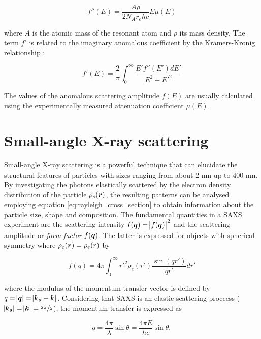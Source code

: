 \begin{equation}
        f'' (E) = \frac{A\rho}{2N_A r_e h c} E \mu(E)
\end{equation}

where $A$ is the atomic mass of the resonant atom and $\rho$ its mass density. The term $f'$ is related to the imaginary anomalous coefficient by the Kramers-Kronig relationship \citep{de_l._kronig_theory_1926,kramers_diffusion_1927}:

\begin{equation}
        f'(E) = \frac{2}{\pi} \int_0^{\infty} \frac{E'f''(E')dE'}{E^2 - E'^2}
\end{equation}

The values of the anomalous scattering amplitude $f(E)$ are usually calculated using the experimentally measured attenuation coefficient $\mu(E)$.

\section{Small-angle X-ray scattering}
\label{sec:SAXS_theory}

Small-angle X-ray scattering is a powerful technique that can elucidate the structural features of particles with sizes ranging from about 2 nm up to 400 nm. By investigating the photons elastically scattered by the electron density distribution of the particle $\rho_e ( \bm{r} )$, the resulting patterns can be analysed employing equation \ref{eq:rayleigh_cross_section} to obtain information about the particle size, shape and composition. The fundamental quantities in a SAXS experiment are the scattering intensity $I(\bm{q}) = \abs{f(\bm{q})}^2$ and the scattering amplitude or \emph{form factor} $f(\bm{q})$. The latter is expressed for objects with spherical symmetry where $\rho_e(\bm{r})=\rho_e(r)$ by

\begin{equation}
        \label{eq:FormFactorSpherical}
        f(q)=4\pi \int_0^{\infty} r'^2 \rho_e(r')  \frac{\sin(qr')}{qr'}  dr'
\end{equation}

where the modulus of the momentum transfer vector is defined by $q=\abs{\bm{q}}=\abs{\bm{k_s} - \bm{k}}$. Considering that SAXS is an elastic scattering proccess ($\abs{\bm{k_s}}=\abs{\bm{k}}=\sfrac{2\pi}{\lambda}$), the momentum transfer is expressed as

\begin{equation}
q=\frac{4\pi }{\lambda}\sin\theta=\frac{4\pi E}{h c}\sin\theta ,
\end{equation}

